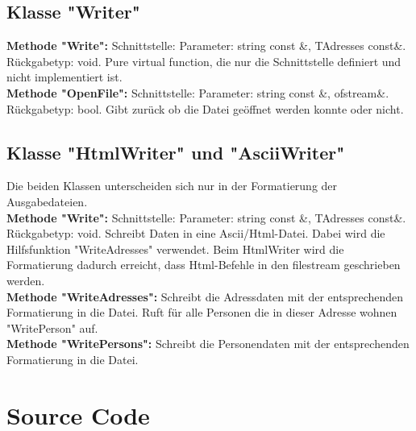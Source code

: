 \documentclass[12pt,a4paper]{article}
\begin{document}
\subsection {Klasse "Writer"}
\textbf {Methode "Write":}
\newline
Schnittstelle: Parameter: string const \&, TAdresses const\&. Rückgabetyp: void.
\newline
Pure virtual function, die nur die Schnittstelle definiert und nicht implementiert ist. \\
\newline
\textbf {Methode "OpenFile":}
\newline
Schnittstelle: Parameter: string const \&, ofstream\&. Rückgabetyp: bool.
\newline
Gibt zurück ob die Datei geöffnet werden konnte oder nicht. \\

\subsection {Klasse "HtmlWriter" und "AsciiWriter"}
Die beiden Klassen unterscheiden sich nur in der Formatierung der Ausgabedateien. \\
\newline
\textbf {Methode "Write":}
\newline
Schnittstelle: Parameter: string const \&, TAdresses const\&. Rückgabetyp: void.
\newline
Schreibt Daten in eine Ascii/Html-Datei. Dabei wird die Hilfsfunktion "WriteAdresses" verwendet. Beim HtmlWriter wird die Formatierung dadurch erreicht, dass Html-Befehle in den filestream geschrieben werden.\\
\textbf {Methode "WriteAdresses":}
\newline
Schreibt die Adressdaten mit der entsprechenden Formatierung in die Datei. Ruft für alle Personen die in dieser Adresse wohnen "WritePerson" auf. \\
\textbf {Methode "WritePersons":}
\newline
Schreibt die Personendaten mit der entsprechenden Formatierung in die Datei. \\

\newpage
\section {Source Code}



\end{document}
